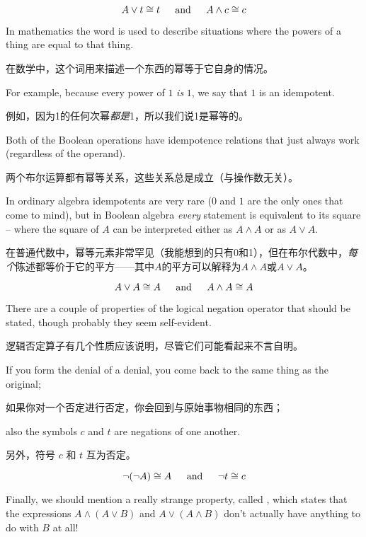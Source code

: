 \[ A \lor t \cong t \mbox{\rule{12pt}{0pt} and \rule{12pt}{0pt}} 
A \land c \cong c \]
 
In mathematics the word  is used to describe situations where 
the powers of a thing are equal to that thing.

在数学中，这个词用来描述一个东西的幂等于它自身的情况。

For example, because every power of $1$ {\em is} $1$, we say that $1$ is an idempotent.

例如，因为1的任何次幂{\em 都是}1，所以我们说1是幂等的。

Both of the Boolean operations 
have idempotence relations that just always work (regardless of the operand).

两个布尔运算都有幂等关系，这些关系总是成立（与操作数无关）。

In ordinary algebra idempotents are very rare ($0$ and $1$ are the only
ones that come to mind), but in Boolean algebra {\em every} statement
is equivalent to its square -- where the square of $A$ can be interpreted 
either as $A \land A$ or as $A \lor A$.

在普通代数中，幂等元素非常罕见（我能想到的只有0和1），但在布尔代数中，{\em 每个}陈述都等价于它的平方——其中$A$的平方可以解释为$A \land A$或$A \lor A$。

\[ A \lor A \cong A \mbox{\rule{12pt}{0pt} and \rule{12pt}{0pt}}%
A \land A \cong A \]

There are a couple of properties of the logical negation operator 
that should be stated, though probably they seem self-evident.

逻辑否定算子有几个性质应该说明，尽管它们可能看起来不言自明。

If you form the denial of a denial, you come back to the 
same thing as the original;

如果你对一个否定进行否定，你会回到与原始事物相同的东西；

also the symbols $c$ and $t$ are negations
of one another.

另外，符号 $c$ 和 $t$ 互为否定。

\[ \lnot({\lnot}A) \cong A \mbox{\rule{12pt}{0pt} and \rule{12pt}{0pt}}%
{\lnot}t  \cong c \] 

Finally, we should mention a really strange property, called 
,
which states that the expressions $A \land (A \lor B)$ and $A \lor (A \land B)$
don't actually have anything to do with $B$ at all!

